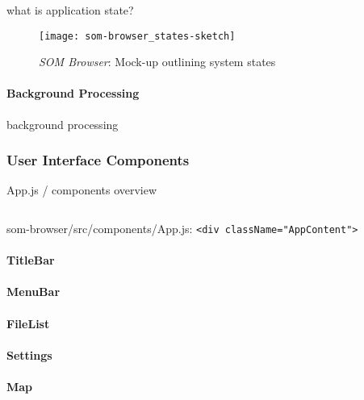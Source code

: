 what is application state?

\begin{figure}[!htb]
  \centering
  \texttt{[image: som-browser\_states-sketch]}
  \caption{\textit{SOM Browser}: Mock-up outlining system states}
  \label{fig:som-browser_states}
\end{figure}

\paragraph{Background Processing}
\label{para:som-browser_background_processing}
background processing


\subsubsection{User Interface Components}
\label{subsubsec:som-browser_components}
App.js / components overview

\begin{listing}[!htb]
  \begin{mdframed}
    \inputminted[numbers=left, firstline=400, lastline=460,
    fontsize=\scriptsize]{jsx}{../dev/som-browser/src/components/App.js}
  \end{mdframed}
  \caption{som-browser/src/components/App.js:
  \texttt{<div className="AppContent">}}
  \label{lst:som-browser_app_content}
\end{listing}

\paragraph{TitleBar}
\label{para:title_bar}

\paragraph{MenuBar}
\label{para:menu_bar}

\paragraph{FileList}
\label{para:file_list}

\paragraph{Settings}
\label{para:settings}

\paragraph{Map}
\label{para:map}

